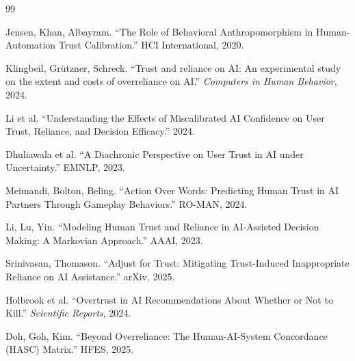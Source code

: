 \documentclass[12pt]{article}
\begin{document}
\renewcommand{\refname}{References}
\begin{thebibliography}{99}

Jensen, Khan, Albayram. ``The Role of Behavioral Anthropomorphism in Human-Automation Trust Calibration.'' HCI International, 2020.

Klingbeil, Gr\"utzner, Schreck. ``Trust and reliance on AI: An experimental study on the extent and costs of overreliance on AI.'' \textit{Computers in Human Behavior}, 2024.

Li et al. ``Understanding the Effects of Miscalibrated AI Confidence on User Trust, Reliance, and Decision Efficacy.'' 2024.

Dhuliawala et al. ``A Diachronic Perspective on User Trust in AI under Uncertainty.'' EMNLP, 2023.

Meimandi, Bolton, Beling. ``Action Over Words: Predicting Human Trust in AI Partners Through Gameplay Behaviors.'' RO-MAN, 2024.

Li, Lu, Yin. ``Modeling Human Trust and Reliance in AI-Assisted Decision Making: A Markovian Approach.'' AAAI, 2023.

Srinivasan, Thomason. ``Adjust for Trust: Mitigating Trust-Induced Inappropriate Reliance on AI Assistance.'' arXiv, 2025.

Holbrook et al. ``Overtrust in AI Recommendations About Whether or Not to Kill.'' \textit{Scientific Reports}, 2024.

Doh, Goh, Kim. ``Beyond Overreliance: The Human-AI-System Concordance (HASC) Matrix.'' HFES, 2025.

\end{thebibliography}
\end{document}

